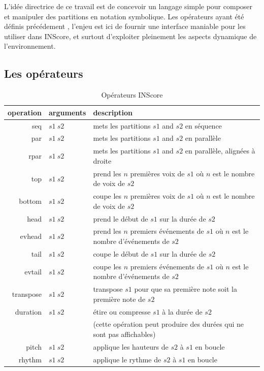 \documentclass{article}
\begin{document}
L'idée directrice de ce travail est de concevoir un langage simple pour composer et manipuler des partitions en notation symbolique. Les opérateurs ayant été définis précédement \cite{fober12b}, l'enjeu est ici de fournir une interface maniable pour les utiliser dans INScore, et surtout d'exploiter pleinement les aspects dynamique de l'environnement.

\subsection{Les opérateurs}

\begin{table}[htdp]
\begin{center}
\begin{tabular}{rll}
\hline
operation & arguments		&	description \\
\hline
seq 	&	$s1\ s2$		& mets les partitions $s1$ and $s2$ en séquence \\
par 	&	$s1\ s2$		& mets les partitions $s1$ and $s2$ en parallèle \\ 
rpar	&	$s1\ s2$		& mets les partitions $s1$ and $s2$ en parallèle, alignées à droite \\
top 	&	$s1\ s2$ 	& prend les $n$ premières voix de $s1$ où $n$ est le nombre de voix de $s2$ \\
bottom 	&	$s1\ s2$ 	& coupe les $n$ premières voix de $s1$ où $n$ est le nombre de voix de $s2$ \\
head	& 	$s1\ s2$	& prend le début de $s1$ sur la durée de $s2$ \\
evhead 	&	$s1\ s2$	& prend les $n$ premiers événements de $s1$ où $n$ est le nombre d'événements de $s2$ \\
tail	&	$s1\ s2$ 	& coupe le début de $s1$ sur la durée de $s2$ \\
evtail 	&	$s1\ s2$ 	& coupe les $n$ premiers événements de $s1$ où $n$ est le nombre d'événements de $s2$ \\
transpose 	&	$s1\ s2$	& transpose $s1$ pour que sa première note soit la première note de $s2$ \\
duration 	&	$s1\ s2$	& étire ou compresse $s1$ à la durée de $s2$  \\
			& 	& 	(cette opération peut produire des durées qui ne sont pas affichables) \\
pitch 	&	$s1\ s2$	& applique les hauteurs de $s2$ à $s1$ en boucle \\
rhythm 	&	$s1\ s2$	& applique le rythme de $s2$ à $s1$ en boucle \\
\hline
\end{tabular}
\end{center}

\caption{Opérateurs INScore}
\label{operations}
\end{table}
\end{document}
